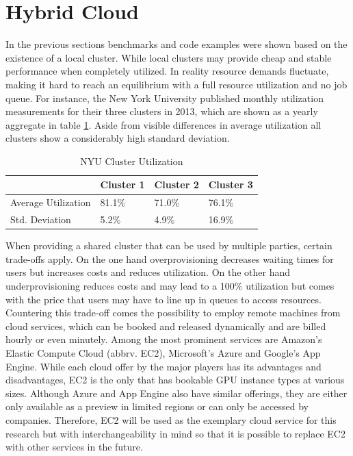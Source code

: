 \section{Hybrid Cloud}

In the previous sections benchmarks and code examples were shown based on the existence of a local cluster.
While local clusters may provide cheap and stable performance when completely utilized. In reality resource demands fluctuate, making it hard to reach an equilibrium with a full resource utilization and no job queue. For instance, the New York University published monthly utilization measurements for their three clusters in 2013\cite{nyu}, which are shown as a yearly aggregate in table \ref{table:cluster_utilization}. Aside from visible differences in average utilization all clusters show a considerably high standard deviation.

\begin{table}[!htb]
	\centering
	\begin{adjustbox}{width=0.5\textwidth}
		\small
		\begin{tabular}{l | l | l | l}
			~						& Cluster 1	& Cluster 2	& Cluster 3                 \\
			\hline
			Average Utilization 	& 81.1\%  	& 71.0\% 	& 76.1\% \\
			Std. Deviation          & 5.2\%  	& 4.9\%		& 16.9\% \\
		\end{tabular}
	\end{adjustbox}
	
	\caption{NYU Cluster Utilization}
	\label{table:cluster_utilization}
\end{table}

When providing a shared cluster that can be used by multiple parties, certain trade-offs apply. On the one hand overprovisioning decreases waiting times for users but increases costs and reduces utilization. On the other hand underprovisioning reduces costs and may lead to a 100\% utilization but comes with the price that users may have to line up in queues to access resources. Countering this trade-off comes the possibility to employ remote machines from cloud services, which can be booked and released dynamically and are billed hourly or even minutely. Among the most prominent services are Amazon's Elastic Compute Cloud (abbrv. EC2), Microsoft's Azure and Google's App Engine. While each cloud offer by the major players has its advantages and disadvantages, EC2 is the only that has bookable GPU instance types at various sizes. Although Azure and App Engine also have similar offerings, they are either only available as a preview in limited regions or can only be accessed by companies. Therefore, EC2 will be used as the exemplary cloud service for this research but with interchangeability in mind so that it is possible to replace EC2 with other services in the future.

